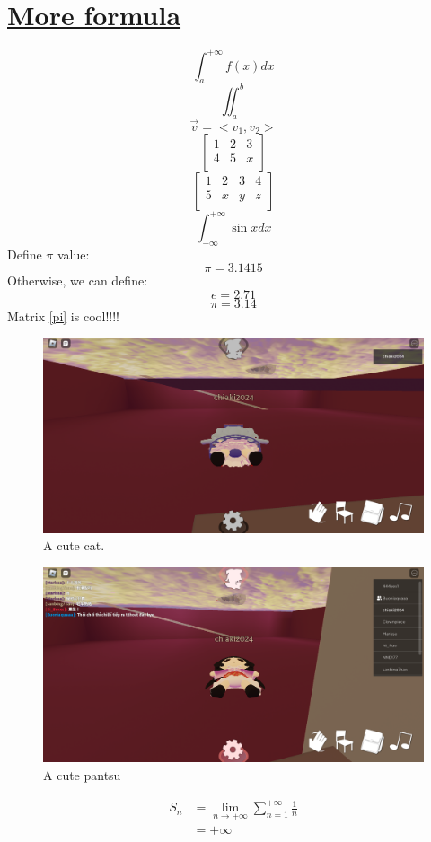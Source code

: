 \documentclass{article}
\begin{document}
\section*{\underline{More formula}}
$$\int_{a}^{+\infty}f(x)dx$$
$$\iint_{a}^{b}$$
$$\vec{v}=<v_1,v_2>$$
$$\begin{bmatrix}
1 & 2 &3\\
4 & 5 & x \\
\end{bmatrix}$$
$$\begin{bmatrix}
    1&2&3&4\\
    5&x&y&z\\
\end{bmatrix}$$
$$\int_{-\infty}^{+\infty}\sin{x}dx$$
Define $\pi$ value: $$\pi=3.1415$$
Otherwise, we can define:
\begin{equation}
    e=2.71
\end{equation}
\begin{equation}
\label{pi}
    \pi=3.14 
\end{equation}
Matrix \ref{pi} is cool!!!!
\begin{figure}
    \centering
    \includegraphics[width=1\textwidth]{sakuya.png}
    \caption{A cute cat.}
    \label{fig:cat}
    \end{figure}
\begin{figure}[h]
    \centering
    \includegraphics[width=1\textwidth]{pantsu.png}
    \caption{A cute pantsu}
\end{figure}
\begin{equation}
\begin{split}
S_{n}&=\lim_{n\to+\infty}\sum_{n=1}^{+\infty}\frac{1}{n}\\&=+\infty
\end{split}
\end{equation}
\newpage
\end{document}
